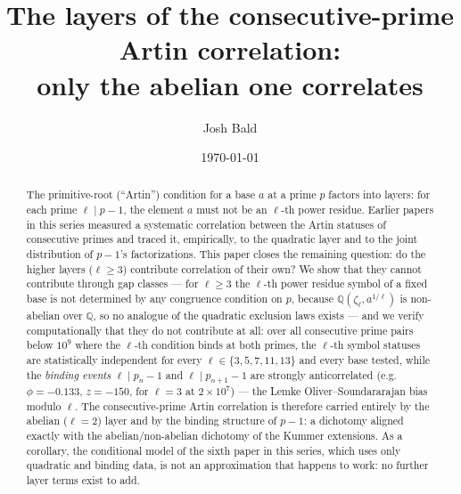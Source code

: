 \documentclass[11pt,reqno]{amsart}
\theoremstyle{plain}
\theoremstyle{definition}
\newcommand{\Q}{\mathbb{Q}}
\begin{document}
\title[The layers of the consecutive-prime Artin correlation]
{The layers of the consecutive-prime Artin correlation:\\
only the abelian one correlates}

\author{Josh Bald}
\address{Ontario, Canada}


\date{\today}

\begin{abstract}
The primitive-root (``Artin'') condition for a base $a$ at a prime $p$
factors into layers: for each prime $\ell \mid p - 1$, the element $a$ must
not be an $\ell$-th power residue. Earlier papers in this series measured a
systematic correlation between the Artin statuses of consecutive primes and
traced it, empirically, to the quadratic layer and to the joint distribution
of $p - 1$'s factorizations. This paper closes the remaining question: do the
higher layers ($\ell \ge 3$) contribute correlation of their own? We show
that they cannot contribute through gap classes --- for $\ell \ge 3$ the
$\ell$-th power residue symbol of a fixed base is not determined by any
congruence condition on $p$, because $\Q(\zeta_\ell, a^{1/\ell})$ is
non-abelian over $\Q$, so no analogue of the quadratic exclusion laws exists
--- and we verify computationally that they do not contribute at all: over
all consecutive prime pairs below $10^9$ where the $\ell$-th condition binds
at both primes, the $\ell$-th symbol statuses are statistically independent
for every $\ell \in \{3,5,7,11,13\}$ and every base tested, while the
\emph{binding events} $\ell \mid p_n - 1$ and $\ell \mid p_{n+1} - 1$ are
strongly anticorrelated (e.g.\ $\phi = -0.133$, $z = -150$, for $\ell = 3$ at
$2\times 10^7$) --- the Lemke Oliver--Soundararajan bias modulo $\ell$. The
consecutive-prime Artin correlation is therefore carried entirely by the
abelian ($\ell = 2$) layer and by the binding structure of $p-1$: a
dichotomy aligned exactly with the abelian/non-abelian dichotomy of the
Kummer extensions. As a corollary, the conditional model of the sixth paper
in this series, which uses only quadratic and binding data, is not an
approximation that happens to work: no further layer terms exist to add.
\end{abstract}

\maketitle
\end{document}
